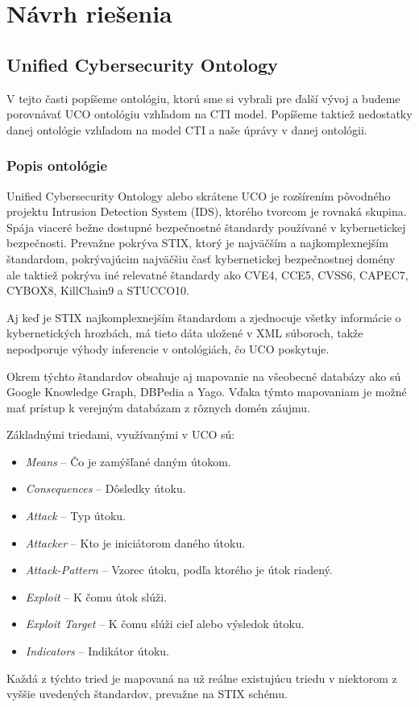 \documentclass[12pt, a4paper, oneside]{book}
\begin{document}
\part{Návrh riešenia}
\chapter{Unified Cybersecurity Ontology}
V tejto časti popíšeme ontológiu, ktorú sme si vybrali pre ďalší vývoj a budeme porovnávať UCO ontológiu vzhľadom na CTI model. Popíšeme taktiež nedostatky danej ontológie vzhľadom na model CTI a naše úprávy v danej ontológii.


\section{Popis ontológie}
Unified Cybersecurity Ontology \citep{SyedPFMJ16} alebo skrátene UCO je rozšírením pôvodného projektu Intrusion Detection System (IDS), ktorého tvorcom je rovnaká skupina. Spája viaceré bežne dostupné bezpečnostné štandardy používané v kybernetickej bezpečnosti. Prevažne pokrýva STIX, ktorý je najväčším a najkomplexnejším štandardom, pokrývajúcim najväčšiu časť kybernetickej bezpečnostnej domény ale taktiež pokrýva iné relevatné štandardy ako CVE4, CCE5, CVSS6, CAPEC7, CYBOX8, KillChain9 a STUCCO10.


Aj keď je STIX najkomplexnejším štandardom a zjednocuje všetky informácie o kybernetických hrozbách, má tieto dáta uložené v XML súboroch, takže nepodporuje výhody inferencie v ontológiách, čo UCO poskytuje.


Okrem týchto štandardov obsahuje aj mapovanie na všeobecné databázy ako sú Google Knowledge Graph, DBPedia a Yago. Vďaka týmto mapovaniam je možné mať prístup k verejným databázam z rôznych domén záujmu.


Základnými triedami, využívanými v UCO sú: 
\begin{itemize}
\item \textit{Means} -- Čo je zamýšľané daným útokom.
\item \textit{Consequences} -- Dôsledky útoku.
\item \textit{Attack} -- Typ útoku.
\item \textit{Attacker} -- Kto je iniciátorom daného útoku.
\item \textit{Attack-Pattern} -- Vzorec útoku, podľa ktorého je útok riadený.
\item \textit{Exploit} -- K čomu útok slúži.
\item \textit{Exploit Target} -- K čomu slúži cieľ alebo výsledok útoku.
\item \textit{Indicators} -- Indikátor útoku.
\end{itemize}
Každá z týchto tried je mapovaná na už reálne existujúcu triedu v niektorom z vyššie uvedených štandardov, prevažne na STIX schému.
\end{document}
